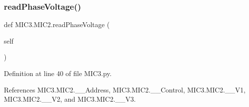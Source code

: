 \mbox{\label{class_m_i_c3_1_1_m_i_c2_aa7db63e0fb9c6b1be36d0617c76707c0}} 
\subsubsection{\texorpdfstring{read\+Phase\+Voltage()}{readPhaseVoltage()}}
{\footnotesize\ttfamily def M\+I\+C3.\+M\+I\+C2.\+read\+Phase\+Voltage (\begin{DoxyParamCaption}\item[{}]{self }\end{DoxyParamCaption})}



Definition at line 40 of file M\+I\+C3.\+py.



References M\+I\+C3.\+M\+I\+C2.\+\_\+\+\_\+\+Address, M\+I\+C3.\+M\+I\+C2.\+\_\+\+\_\+\+Control, M\+I\+C3.\+M\+I\+C2.\+\_\+\+\_\+\+V1, M\+I\+C3.\+M\+I\+C2.\+\_\+\+\_\+\+V2, and M\+I\+C3.\+M\+I\+C2.\+\_\+\+\_\+\+V3.


